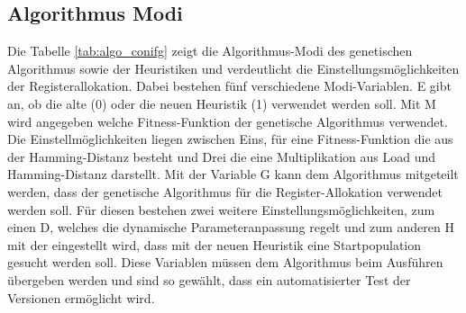 \newpage
\subsection{Algorithmus Modi}
Die Tabelle \ref{tab:algo_conifg} zeigt die Algorithmus-Modi des genetischen Algorithmus sowie der Heuristiken und verdeutlicht die Einstellungsmöglichkeiten der Registerallokation. Dabei bestehen fünf verschiedene Modi-Variablen. E gibt an, ob die alte (0) oder die neuen Heuristik (1) verwendet werden soll. Mit M wird angegeben welche Fitness-Funktion der genetische Algorithmus verwendet. Die Einstellmöglichkeiten liegen zwischen Eins, für eine Fitness-Funktion die aus der Hamming-Distanz besteht und Drei die eine Multiplikation aus Load und Hamming-Distanz darstellt. Mit der Variable G  kann dem Algorithmus mitgeteilt werden, dass der genetische Algorithmus für die Register-Allokation verwendet werden soll. Für diesen bestehen zwei weitere Einstellungsmöglichkeiten, zum einen D, welches die dynamische Parameteranpassung regelt und zum anderen H mit der eingestellt wird, dass mit der neuen Heuristik eine Startpopulation gesucht werden soll. Diese Variablen müssen dem Algorithmus beim Ausführen übergeben werden und sind so gewählt, dass ein automatisierter Test der Versionen ermöglicht wird.

